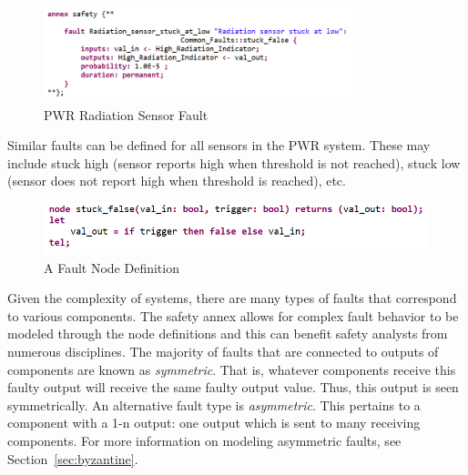 \begin{figure}[h!]
	\begin{center}
		\includegraphics[width=0.8\textwidth]{images/radiationSensorFault.png}
		\caption{PWR Radiation Sensor Fault}
		\label{fig:radiationSensorFault}
	\end{center}
\end{figure}

Similar faults can be defined for all sensors in the PWR system. These may include stuck high (sensor reports high when threshold is not reached), stuck low (sensor does not report high when threshold is reached), etc. 
\begin{figure}[h!]
	\hspace*{-2cm}
	\vspace{-0.1in} 
	\begin{center}
		\includegraphics[scale=0.8]{images/stuckFalseNode.png}
	\caption{A Fault Node Definition}
		\label{fig:stuckFalseNode}
	\end{center}
\end{figure}

Given the complexity of systems, there are many types of faults that correspond to various components. The safety annex allows for complex fault behavior to be modeled through the node definitions and this can benefit safety analysts from numerous disciplines. The majority of faults that are connected to outputs of components are known as \textit{symmetric}. That is, whatever components receive this faulty output will receive the same faulty output value. Thus, this output is seen symmetrically. An alternative fault type is \textit{asymmetric}. This pertains to a component with a 1-n output: one output which is sent to many receiving components. For more information on modeling asymmetric faults, see Section~\ref{sec:byzantine}. %



